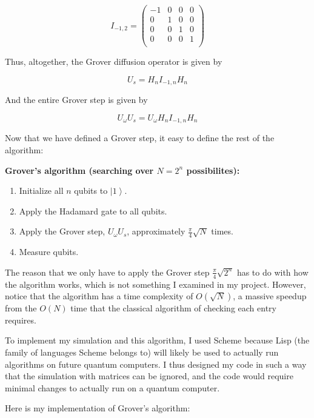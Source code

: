 \documentclass[11pt]{article}
\begin{document}
$$I_{-1,2}=\begin{pmatrix}
-1 & 0 & 0 & 0 \\
0 & 1 & 0 & 0 \\
0 & 0 & 1 & 0 \\
0 & 0 & 0 & 1 \\
\end{pmatrix}$$

Thus, altogether, the Grover diffusion operator is given by

$$U_{s}=H_{n} I_{-1,n} H_{n}$$

And the entire Grover step is given by

$$U_{\omega} U_{s} = U_{\omega} H_{n} I_{-1,n} H_{n}$$

Now that we have defined a Grover step, it easy to define the rest of the algorithm:

\begin{framed}
\textbf{Grover's algorithm (searching over $N=2^{n}$ possibilites):}
\begin{enumerate}
	\item Initialize all $n$ qubits to $\left | 1 \right \rangle$.
	\item Apply the Hadamard gate to all qubits.
	\item Apply the Grover step, $U_{\omega} U_{s}$, approximately $\frac{\pi}{4} \sqrt{N}$ times.
	\item Measure qubits.
\end{enumerate}
\end{framed}

The reason that we only have to apply the Grover step $\frac{\pi}{4} \sqrt{2^{n}}$ has to do with how the algorithm works, which is not something I examined in my project. However, notice that the algorithm has a time complexity of $O(\sqrt{N})$, a massive speedup from the $O(N)$ time that the classical algorithm of checking each entry requires.

To implement my simulation and this algorithm, I used Scheme because Lisp (the family of languages Scheme belongs to) will likely be used to actually run algorithms on future quantum computers. I thus designed my code in such a way that the simulation with matrices can be ignored, and the code would require minimal changes to actually run on a quantum computer.

Here is my implementation of Grover's algorithm:
\end{document}
